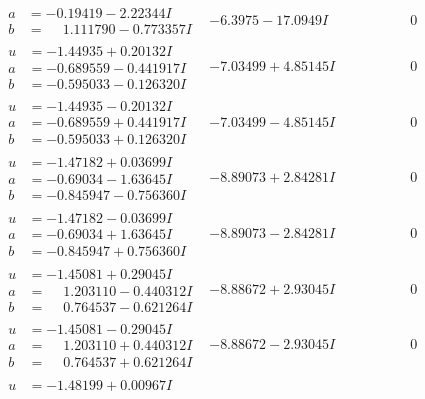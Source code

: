 \documentclass[1p]{elsarticle_modified}
\theoremstyle{definition}
\begin{document}
$$\begin{array}{c|c|c}
\begin{aligned}
a &= -0.19419 - 2.22344 I \\
b &= \phantom{-}1.111790 - 0.773357 I\end{aligned}
 & -6.3975 - 17.0949 I & \phantom{-0.000000 } 0 \\ \hline\begin{aligned}
u &= -1.44935 + 0.20132 I \\
a &= -0.689559 - 0.441917 I \\
b &= -0.595033 - 0.126320 I\end{aligned}
 & -7.03499 + 4.85145 I & \phantom{-0.000000 } 0 \\ \hline\begin{aligned}
u &= -1.44935 - 0.20132 I \\
a &= -0.689559 + 0.441917 I \\
b &= -0.595033 + 0.126320 I\end{aligned}
 & -7.03499 - 4.85145 I & \phantom{-0.000000 } 0 \\ \hline\begin{aligned}
u &= -1.47182 + 0.03699 I \\
a &= -0.69034 - 1.63645 I \\
b &= -0.845947 - 0.756360 I\end{aligned}
 & -8.89073 + 2.84281 I & \phantom{-0.000000 } 0 \\ \hline\begin{aligned}
u &= -1.47182 - 0.03699 I \\
a &= -0.69034 + 1.63645 I \\
b &= -0.845947 + 0.756360 I\end{aligned}
 & -8.89073 - 2.84281 I & \phantom{-0.000000 } 0 \\ \hline\begin{aligned}
u &= -1.45081 + 0.29045 I \\
a &= \phantom{-}1.203110 - 0.440312 I \\
b &= \phantom{-}0.764537 - 0.621264 I\end{aligned}
 & -8.88672 + 2.93045 I & \phantom{-0.000000 } 0 \\ \hline\begin{aligned}
u &= -1.45081 - 0.29045 I \\
a &= \phantom{-}1.203110 + 0.440312 I \\
b &= \phantom{-}0.764537 + 0.621264 I\end{aligned}
 & -8.88672 - 2.93045 I & \phantom{-0.000000 } 0 \\ \hline\begin{aligned}
u &= -1.48199 + 0.00967 I \\

\end{aligned}
\end{array}$$
\end{document}
